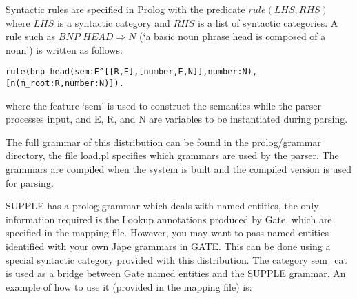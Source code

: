 Syntactic rules are specified in Prolog with the predicate
$rule(LHS,RHS)$ where $LHS$ is a syntactic category and
$RHS$ is a list of syntactic categories. A rule such as $BNP\_HEAD
\Rightarrow N$ (`a basic noun phrase head is composed of a noun') is
written as follows:

\begin{small}\begin{verbatim}
rule(bnp_head(sem:E^[[R,E],[number,E,N]],number:N),
[n(m_root:R,number:N)]).
\end{verbatim}\end{small}
where the feature `sem' is used to construct the semantics while the parser
processes input, and E, R, and N are variables to be instantiated during parsing.

The full grammar of this distribution can be found in the prolog/grammar
directory, the file load.pl specifies which grammars are used by the parser. The
grammars are compiled when the system is built and the compiled version is used
for parsing.


SUPPLE has a prolog grammar which deals with named entities, the only
information required is the Lookup annotations produced by Gate, which are
specified in the mapping file. However, you may want to pass named entities
identified with your own Jape grammars in GATE. This can be done using a special
syntactic category provided with this distribution. The category sem\_cat is
used as a bridge between Gate named entities and the SUPPLE grammar. An example
of how to use it (provided in the mapping file) is:

